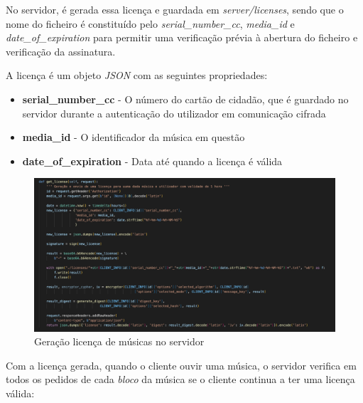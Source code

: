 \documentclass[10pt,english]{article}
\begin{document}
\par No servidor, é gerada essa licença e guardada em \textit{server/licenses}, sendo que o nome do ficheiro é constituído pelo \textit{serial\_number\_cc}, \textit{media\_id} e \textit{date\_of\_expiration} para permitir uma verificação prévia à abertura do ficheiro e verificação da assinatura.

\par A licença é um objeto \textit{JSON} com as seguintes propriedades:

\begin{itemize}
    \item \textbf{serial\_number\_cc} - O número do cartão de cidadão, que é guardado no servidor durante a autenticação do utilizador em comunicação cifrada
    \item \textbf{media\_id} - O identificador da música em questão
    \item \textbf{date\_of\_expiration} - Data até quando a licença é válida
\end{itemize}

\clearpage

\begin{figure}[!h]
        \centering
        \includegraphics[width=\textwidth]{images/get_license_server.png}
        \caption{Geração licença de músicas no servidor}
\end{figure}

\par Com a licença gerada, quando o cliente ouvir uma música, o servidor verifica em todos os pedidos de cada \textit{bloco} da música se o cliente continua a ter uma licença válida:
\end{document}
